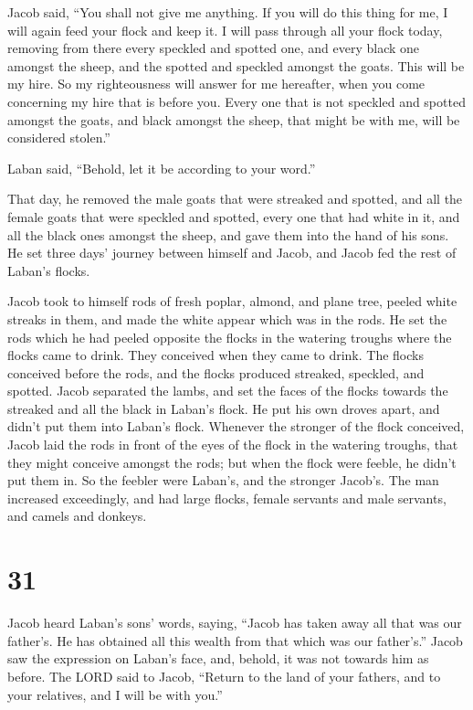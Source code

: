 Jacob said, ``You shall not give me anything. If you will do this thing
for me, I will again feed your flock and keep it.  I will
pass through all your flock today, removing from there every speckled
and spotted one, and every black one amongst the sheep, and the spotted
and speckled amongst the goats. This will be my hire.  So
my righteousness will answer for me hereafter, when you come concerning
my hire that is before you. Every one that is not speckled and spotted
amongst the goats, and black amongst the sheep, that might be with me,
will be considered stolen.''

 Laban said, ``Behold, let it be according to your word.''

 That day, he removed the male goats that were streaked and
spotted, and all the female goats that were speckled and spotted, every
one that had white in it, and all the black ones amongst the sheep, and
gave them into the hand of his sons.  He set three days'
journey between himself and Jacob, and Jacob fed the rest of Laban's
flocks.

 Jacob took to himself rods of fresh poplar, almond, and
plane tree, peeled white streaks in them, and made the white appear
which was in the rods.  He set the rods which he had peeled
opposite the flocks in the watering troughs where the flocks came to
drink. They conceived when they came to drink.  The flocks
conceived before the rods, and the flocks produced streaked, speckled,
and spotted.  Jacob separated the lambs, and set the faces
of the flocks towards the streaked and all the black in Laban's flock.
He put his own droves apart, and didn't put them into Laban's flock.
 Whenever the stronger of the flock conceived, Jacob laid
the rods in front of the eyes of the flock in the watering troughs, that
they might conceive amongst the rods;  but when the flock
were feeble, he didn't put them in. So the feebler were Laban's, and the
stronger Jacob's.  The man increased exceedingly, and had
large flocks, female servants and male servants, and camels and donkeys.

\hypertarget{section-30}{%
\section{31}\label{section-30}}

 Jacob heard Laban's sons' words, saying, ``Jacob has taken
away all that was our father's. He has obtained all this wealth from
that which was our father's.''  Jacob saw the expression on
Laban's face, and, behold, it was not towards him as before.
 The LORD said to Jacob, ``Return to the land of your
fathers, and to your relatives, and I will be with you.''

